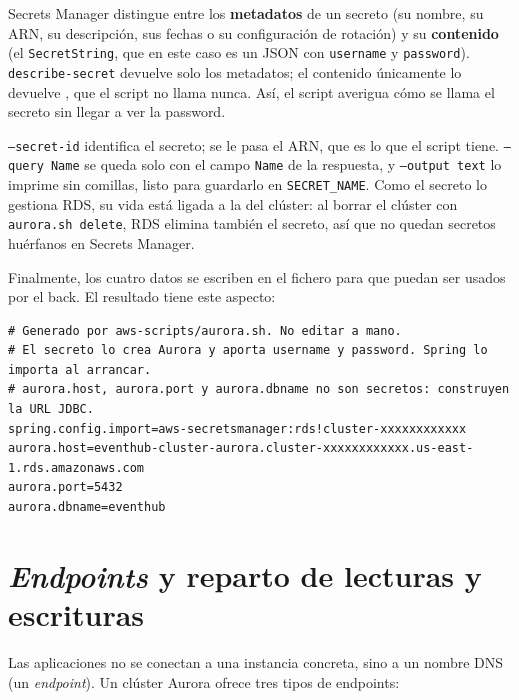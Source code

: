 \documentclass[12pt,a4paper]{article}
\begin{document}
\vspace{1em}

Secrets Manager distingue entre los \textbf{metadatos} de un secreto (su nombre, su ARN, su descripción, sus fechas o su configuración de rotación) y su \textbf{contenido} (el \texttt{SecretString}, que en este caso es un JSON con \texttt{username} y \texttt{password}). \texttt{describe-secret} devuelve solo los metadatos; el contenido únicamente lo devuelve \texttt{}, que el script no llama nunca. Así, el script averigua cómo se llama el secreto sin llegar a ver la password.

\texttt{--secret-id} identifica el secreto; se le pasa el ARN, que es lo que el script tiene. \texttt{--query Name} se queda solo con el campo \texttt{Name} de la respuesta, y \texttt{--output text} lo imprime sin comillas, listo para guardarlo en \texttt{SECRET\_NAME}. Como el secreto lo gestiona RDS, su vida está ligada a la del clúster: al borrar el clúster con \texttt{aurora.sh delete}, RDS elimina también el secreto, así que no quedan secretos huérfanos en Secrets Manager.

Finalmente, los cuatro datos se escriben en el fichero \texttt{} para que puedan ser usados por el back. El resultado tiene este aspecto:

\begin{lstlisting}[language=properties,basicstyle=\ttfamily\footnotesize]
# Generado por aws-scripts/aurora.sh. No editar a mano.
# El secreto lo crea Aurora y aporta username y password. Spring lo importa al arrancar.
# aurora.host, aurora.port y aurora.dbname no son secretos: construyen la URL JDBC.
spring.config.import=aws-secretsmanager:rds!cluster-xxxxxxxxxxxx
aurora.host=eventhub-cluster-aurora.cluster-xxxxxxxxxxxx.us-east-1.rds.amazonaws.com
aurora.port=5432
aurora.dbname=eventhub
\end{lstlisting}

\section{\textit{Endpoints} y reparto de lecturas y escrituras}\label{sec:endpoints}

Las aplicaciones no se conectan a una instancia concreta, sino a un nombre DNS (un \textit{endpoint}). Un clúster Aurora ofrece tres tipos de endpoints:
\end{document}
